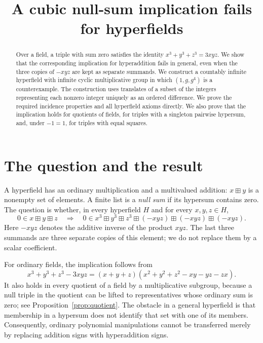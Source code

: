 \documentclass[11pt]{article}
\title{A cubic null-sum implication fails for hyperfields}
\author{}
\date{}
\theoremstyle{remark}
\newcommand{\hs}{\boxplus}
\begin{document}
\maketitle

\begin{abstract}
Over a field, a triple with sum zero satisfies the identity
$x^3+y^3+z^3=3xyz$. We show that the corresponding implication for
hyperaddition fails in general, even when the three copies of $-xyz$ are
kept as separate summands. We construct a countably infinite hyperfield
with infinite cyclic multiplicative group in which $(1,g,g^4)$ is a
counterexample. The construction uses translates of a subset of the
integers representing each nonzero integer uniquely as an ordered
difference. We prove the required incidence properties and all
hyperfield axioms directly. We also prove that the implication holds
for quotients of fields, for triples with a singleton pairwise
hypersum, and, under $-1=1$, for triples with equal squares.
\end{abstract}

\section{The question and the result}

A hyperfield has an ordinary multiplication and a multivalued addition:
$x\hs y$ is a nonempty set of elements. A finite list is a
\emph{null sum} if its hypersum contains zero. The question is whether,
in every hyperfield $H$ and for every $x,y,z\in H$,
\begin{equation}\label{eq:question}
 0\in x\hs y\hs z
 \quad\Longrightarrow\quad
 0\in x^3\hs y^3\hs z^3\hs(-xyz)\hs(-xyz)\hs(-xyz).
\end{equation}
Here $-xyz$ denotes the additive inverse of the product $xyz$.
The last three summands are three separate copies of this element;
we do not replace them by a scalar coefficient.

For ordinary fields, the implication follows from
\begin{equation}\label{eq:field-identity}
 x^3+y^3+z^3-3xyz
 =(x+y+z)(x^2+y^2+z^2-xy-yz-zx).
\end{equation}
It also holds in every quotient of a field by a multiplicative subgroup,
because a null triple in the quotient can be lifted to representatives
whose ordinary sum is zero; see Proposition~\ref{prop:quotient}.
The obstacle in a general hyperfield is that membership in a hypersum
does not identify that set with one of its members. Consequently,
ordinary polynomial manipulations cannot be transferred merely by
replacing addition signs with hyperaddition signs.
\end{document}
